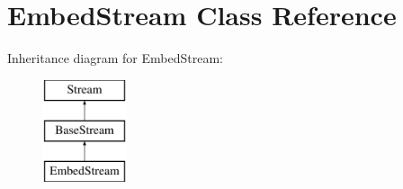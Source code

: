 \hypertarget{class_embed_stream}{}\section{Embed\+Stream Class Reference}
\label{class_embed_stream}
Inheritance diagram for Embed\+Stream\+:\begin{figure}[H]
\begin{center}
\leavevmode
\includegraphics[height=3.000000cm]{class_embed_stream}
\end{center}
\end{figure}
